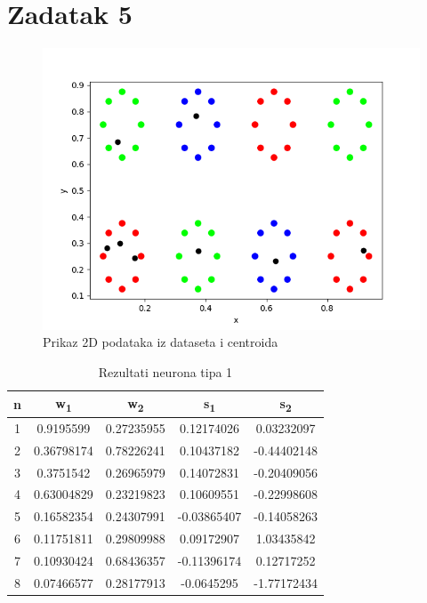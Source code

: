 \documentclass[times, utf8, seminar]{fer}
\begin{document}
\chapter{Zadatak 5}
\begin{figure}[H]
    \centering
    \includegraphics[scale=0.7]{img/zad_5.png}
    \caption[Caption for LOF]{Prikaz 2D podataka iz dataseta i centroida\footnotemark}
    \label{zad5:img}
\end{figure}

\begin{table}[H]
    \centering
    \begin{tabular}{|c c c c c|} 
        \hline
        n & w\textsubscript{1} & w\textsubscript{2} & s\textsubscript{1} & s\textsubscript{2} \\ [0.5ex] 
        \hline\hline
        \rowcolor{Red}
        1 & 0.9195599 & 0.27235955 & 0.12174026 & 0.03232097 \\
        \rowcolor{Blue}
        2 & 0.36798174 & 0.78226241 & 0.10437182 & -0.44402148 \\
        \rowcolor{Green}
        3 & 0.3751542 & 0.26965979 & 0.14072831 & -0.20409056 \\
        \rowcolor{Blue}
        4 & 0.63004829 & 0.23219823 & 0.10609551 & -0.22998608 \\
        \rowcolor{Red}
        5 & 0.16582354 & 0.24307991 & -0.03865407 & -0.14058263 \\
        \rowcolor{Red}
        6 & 0.11751811 & 0.29809988 & 0.09172907 & 1.03435842 \\
        \rowcolor{Green}
        7 & 0.10930424 & 0.68436357 & -0.11396174 & 0.12717252 \\
        \rowcolor{Red}
        8 & 0.07466577 & 0.28177913 & -0.0645295 & -1.77172434 \\ [1ex]
        \hline
    \end{tabular}
    \caption{Rezultati neurona tipa 1}
    \label{zad5:table}
\end{table}
\end{document}
